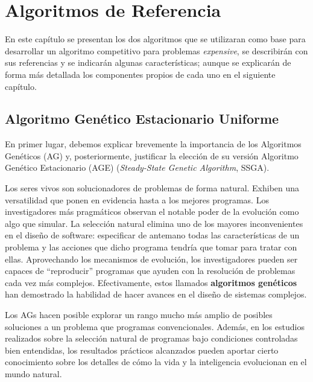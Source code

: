 \chapter{Algoritmos de Referencia}

En este capítulo se presentan los dos algoritmos que se utilizaran como base para desarrollar un algoritmo competitivo para problemas \textit{expensive}, se describirán con sus referencias y se indicarán algunas características; aunque se explicarán de forma más detallada los componentes propios de cada uno en el siguiente capítulo.

\section{Algoritmo Genético Estacionario Uniforme}

En primer lugar, debemos explicar brevemente la importancia de los Algoritmos Genéticos (AG) y, posteriormente, justificar la elección de su versión Algoritmo Genético Estacionario (AGE) (\textit{Steady-State Genetic Algorithm}, SSGA). 

Los seres vivos son solucionadores de problemas de forma natural. 
Exhiben una versatilidad que ponen en evidencia hasta a los mejores programas. 
Los investigadores más pragmáticos observan el notable poder de la evolución como algo que simular. 
La selección natural elimina uno de los mayores inconvenientes en el diseño de software: especificar de antemano todas las características de un problema y las acciones que dicho programa tendría que tomar para tratar con ellas. 
Aprovechando los mecanismos de evolución, los investigadores pueden ser capaces de ``reproducir'' programas que ayuden con la resolución de problemas cada vez más complejos. 
Efectivamente, estos llamados \textbf{algoritmos genéticos} han demostrado la habilidad de hacer avances en el diseño de sistemas complejos. 

Los AGs hacen posible explorar un rango mucho más amplio de posibles soluciones a un problema que programas convencionales. 
Además, en los estudios  realizados sobre la selección natural de programas bajo condiciones controladas bien entendidas, los resultados prácticos alcanzados pueden aportar cierto conocimiento sobre los detalles de cómo la vida y la inteligencia evolucionan en el mundo natural. 

